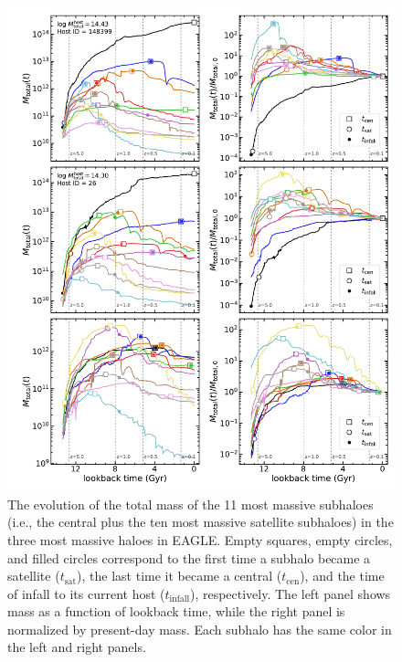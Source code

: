 \documentclass[usenatbib,fleqn]{mnras}
\newcommand{\eagle}{EAGLE}
\begin{document}
\begin{figure}
  \centerline{\includegraphics[width=\linewidth]{track_Mtotal.pdf}}
  \caption{The evolution of the total mass of the 11 most massive subhaloes (i.e., the central plus the ten most massive satellite subhaloes) in the three most massive haloes in \eagle. Empty squares, empty circles, and filled circles correspond to the first time a subhalo became a satellite ($t_\mathrm{sat}$), the last time it became a central ($t_\mathrm{cen}$), and the time of infall to its current host ($t_\mathrm{infall}$), respectively. The left panel shows mass as a function of lookback time, while the right panel is normalized by present-day mass. Each subhalo has the same color in the left and right panels.}
  \label{fig:track_Mtotal}
\end{figure}
\end{document}
